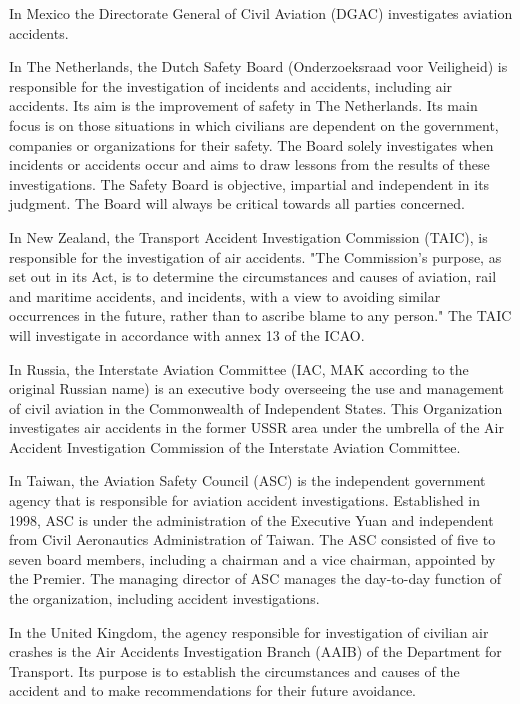 \documentclass[a4paper, 10pt]{article}
\begin{document}
In Mexico the Directorate General of Civil Aviation (DGAC) investigates aviation accidents.\par

In The Netherlands, the Dutch Safety Board (Onderzoeksraad voor Veiligheid) is responsible for the investigation of incidents and accidents, including air accidents. Its aim is the improvement of safety in The Netherlands. Its main focus is on those situations in which civilians are dependent on the government, companies or organizations for their safety. The Board solely investigates when incidents or accidents occur and aims to draw lessons from the results of these investigations. The Safety Board is objective, impartial and independent in its judgment. The Board will always be critical towards all parties concerned.\par

In New Zealand, the Transport Accident Investigation Commission (TAIC), is responsible for the investigation of air accidents. "The Commission's purpose, as set out in its Act, is to determine the circumstances and causes of aviation, rail and maritime accidents, and incidents, with a view to avoiding similar occurrences in the future, rather than to ascribe blame to any person." The TAIC will investigate in accordance with annex 13 of the ICAO. \par

In Russia, the Interstate Aviation Committee (IAC, MAK according to the original Russian name) is an executive body overseeing the use and management of civil aviation in the Commonwealth of Independent States. This Organization investigates air accidents in the former USSR area under the umbrella of the Air Accident Investigation Commission of the Interstate Aviation Committee.\par

In Taiwan, the Aviation Safety Council (ASC) is the independent government agency that is responsible for aviation accident investigations. Established in 1998, ASC is under the administration of the Executive Yuan and independent from Civil Aeronautics Administration of Taiwan. The ASC consisted of five to seven board members, including a chairman and a vice chairman, appointed by the Premier. The managing director of ASC manages the day-to-day function of the organization, including accident investigations.\par

In the United Kingdom, the agency responsible for investigation of civilian air crashes is the Air Accidents Investigation Branch (AAIB) of the Department for Transport. Its purpose is to establish the circumstances and causes of the accident and to make recommendations for their future avoidance.\par
\end{document}
